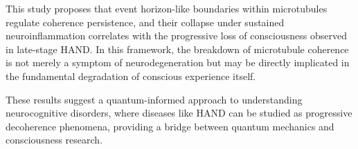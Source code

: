 This study proposes that event horizon-like boundaries within microtubules regulate coherence persistence, and their collapse under sustained neuroinflammation correlates with the progressive loss of consciousness observed in late-stage HAND. In this framework, the breakdown of microtubule coherence is not merely a symptom of neurodegeneration but may be directly implicated in the fundamental degradation of conscious experience itself. 

These results suggest a quantum-informed approach to understanding neurocognitive disorders, where diseases like HAND can be studied as progressive decoherence phenomena, providing a bridge between quantum mechanics and consciousness research.